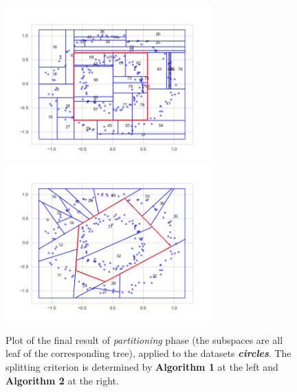\documentclass[a4paper]{article}
\begin{document}
\begin{figure}[H]
        \centering
\includegraphics[width=8cm]{grafici/makecircles_alg1_2.png}
 \includegraphics[width=8cm]{grafici/makecircles_alg2_2.png}
\caption{Plot of the final result of \emph{partitioning} phase (the subspaces are all leaf of the corresponding tree), applied to the datasets \emph{\textbf{circles}}. The splitting criterion is determined by \textbf{Algorithm 1} at the left and \textbf{Algorithm 2} at the right.}
        \label{circles_1vs2}
    \end{figure}
\end{document}
